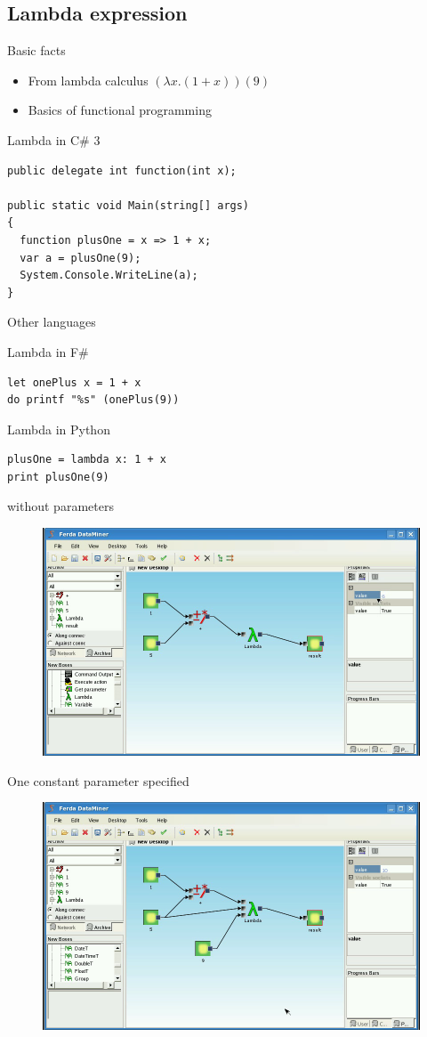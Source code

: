 \documentclass{article}
\begin{document}
\subsection{Lambda expression}
Basic facts
\begin{itemize}
	\item From lambda calculus $(\lambda x.(1+x))(9)$
	\item Basics of functional programming
\end{itemize}

Lambda in C\# 3
\begin{verbatim}
public delegate int function(int x);

public static void Main(string[] args)
{
  function plusOne = x => 1 + x;
  var a = plusOne(9);
  System.Console.WriteLine(a);
}
\end{verbatim}
	
Other languages

Lambda in F\#
\begin{verbatim}
let onePlus x = 1 + x
do printf "%s" (onePlus(9)) 
\end{verbatim}

Lambda in Python
\begin{verbatim}
plusOne = lambda x: 1 + x
print plusOne(9)
\end{verbatim}

without parameters
\begin{figure}
\includegraphics[width=12cm]{lambdaBasic2.png}
	\caption{}
\end{figure}

One constant parameter specified
\begin{figure}
\includegraphics[width=12cm]{lambdaBasic3.png}
	\caption{}
\end{figure}
	
\end{document}
